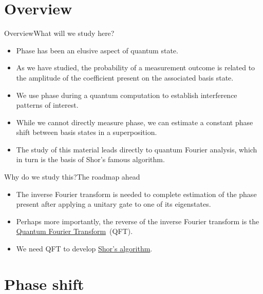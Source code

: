 
\section*{Overview}
\begin{frame}{Overview}{What will we study here?}

\begin{itemize}[<+->]
    \item Phase has been an elusive aspect of quantum state.
    \item As we have studied, the probability of a measurement outcome is related to the amplitude of the coefficient present on the associated basis state.
    \item We use phase during a quantum computation to establish interference patterns of interest.
    \item While we cannot directly measure phase, we can estimate a constant phase shift between basis states in a superposition.
    \item The study of this material leads directly to quantum Fourier analysis, which in turn is the basis of Shor's famous algorithm.
\end{itemize}
    
\end{frame}

\begin{frame}{Why do we study this?}{The roadmap ahead}

\begin{itemize}[<+->]
    \item The inverse Fourier transform is needed to complete estimation of the phase present after applying a unitary gate to one of its eigenstates.
    \item Perhaps more importantly, the reverse of the inverse Fourier transform is the \href{https://en.wikipedia.org/wiki/Quantum_Fourier_transform}{Quantum Fourier Transform}~(QFT).
    \item We need QFT to develop \href{https://en.wikipedia.org/wiki/Shor\%27s_algorithm}{Shor's algorithm}.
\end{itemize}
    
\end{frame}

\section*{Phase shift}

